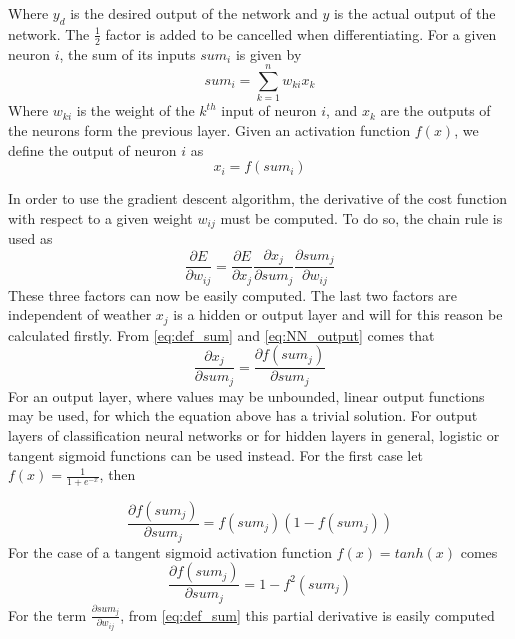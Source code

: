 Where $y_d$ is the desired output of the network and $y$ is the actual output of the network. The $\frac{1}{2}$ factor is added to be cancelled when differentiating. For a given neuron $i$, the sum of its inputs $sum_i$ is given by
\begin{equation}\label{eq:def_sum}
sum_i = \sum ^n_{k=1} w_{ki} x_k
\end{equation}
Where $w_{ki}$ is the weight of the $k^{th}$ input of neuron $i$, and $x_k$ are the outputs of the neurons form the previous layer. Given an activation function $f(x)$, we define the output of neuron $i$ as 
\begin{equation}\label{eq:NN_output}
x_i = f(sum_i)
\end{equation}

In order to use the gradient descent algorithm, the derivative of the cost function with respect to a given weight $w_{ij}$ must be computed. To do so, the chain rule is used as
\begin{equation}\label{eq:gradient}
\frac{\partial E}{\partial w_{ij}} = \frac{\partial E}{\partial x_j}\frac{\partial x_j}{\partial sum_j}\frac{\partial sum_j}{\partial w_{ij}}
\end{equation}
These three factors can now be easily computed. The last two factors are independent of weather $x_j$ is a hidden or output layer and will for this reason be calculated firstly. From \ref{eq:def_sum} and \ref{eq:NN_output} comes that
\begin{equation}
\frac{\partial x_j}{\partial sum_j} = \frac{\partial f(sum_j)}{\partial sum_j}
\end{equation}
For an output layer, where values may be unbounded, linear output functions may be used, for which the equation above has a trivial solution. For output layers of classification neural networks or for hidden layers in general, logistic or tangent sigmoid functions can be used instead. For the first case let $f(x)=\frac{1}{1+e^{-x}}$, then

\begin{equation}
\frac{\partial f(sum_j)}{\partial sum_j}=f(sum_j)(1-f(sum_j))
\end{equation}
For the case of a tangent sigmoid activation function $f(x)=tanh(x)$ comes
\begin{equation}
\frac{\partial f(sum_j)}{\partial sum_j}=1-f^2(sum_j)
\end{equation}
For the term $\frac{\partial sum_j}{\partial w_{ij}}$, from \ref{eq:def_sum} this partial derivative is easily computed

